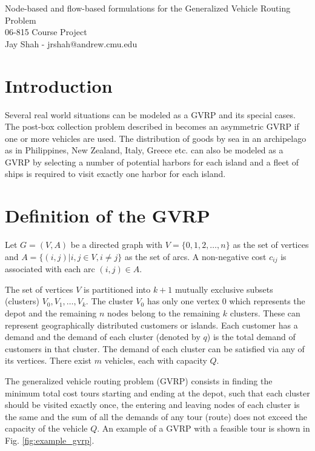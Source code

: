 \documentclass[letterpaper,12pt,onehalfspacing,twoside]{article}
\theoremstyle{msds}
\begin{document}
\pagestyle{plain}

\begingroup  
  \centering
  \LARGE Node-based and flow-based formulations for the Generalized Vehicle Routing Problem
  \\ \large 06-815 Course Project\\
  \large Jay Shah - jrshah@andrew.cmu.edu\par
\endgroup

\section{Introduction}

Several real world situations can be modeled as a GVRP and its special cases. The post-box collection problem described in \citep{Laporte1996} becomes an asymmetric GVRP if one or more vehicles are used. The distribution of goods by sea in an archipelago as in Philippines, New Zealand, Italy, Greece etc. can also be modeled as a GVRP by selecting a number of potential harbors for each island and a fleet of ships is required to visit exactly one harbor for each island.

\section{Definition of the GVRP}

Let $G = (V,A)$ be a directed graph with $V = \{0,1,2,\ldots,n\}$ as the set of vertices and $A = \{(i,j)|i , j \in V , i \ne j\}$ as the set of arcs. A non-negative cost $c_{ij}$ is associated with each arc $(i,j) \in A$.

The set of vertices $V$ is partitioned into $k + 1$ mutually exclusive subsets (clusters) $V_0, V_1, \ldots, V_k$. The cluster $V_0$ has only one vertex $0$ which represents the depot and the remaining $n$ nodes belong to the remaining $k$ clusters. These can represent geographically distributed customers or islands. Each customer has a demand and the demand of each cluster (denoted by $q$) is the total demand of customers in that cluster. The demand of each cluster can be satisfied via any of its vertices. There exist $m$ vehicles, each with capacity $Q$.

The generalized vehicle routing problem (GVRP) consists in finding the minimum total cost tours starting and ending at the depot, such that each cluster should be visited exactly once, the entering and leaving nodes of each cluster is the same and the sum of all the demands of any tour (route) does not exceed the capacity of the vehicle $Q$. An example of a GVRP with a feasible tour is shown in Fig. \ref {fig:example_gvrp}.
\end{document}
